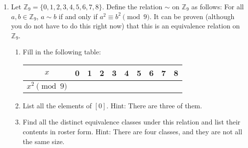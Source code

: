 \documentclass[11pt]{article}
\begin{document}
\begin{enumerate}
	\item Let $\mathbb{Z}_9 = \{ 0, 1, 2, 3, 4, 5, 6, 7, 8\}$. Define the relation $\sim$ on $\mathbb{Z}_9$ as follows: For all $a,b \in \mathbb{Z}_9$, $a \sim b$ if and only if $a^2 \equiv b^2 \pmod 9$. It can be proven (although you do not have to do this right now) that this is an equivalence relation on $\mathbb{Z}_9$. 
	\begin{enumerate}
		\item Fill in the following table: 
		\begin{center}
			\begin{tabular}{c|c|c|c|c|c|c|c|c|c}
			$x$ & 0 & 1 & 2 & 3 & 4 & 5 & 6  & 7 & 8 \\ \hline
			$x^2 \pmod 9$ & & & & & & & &
			\end{tabular}
		\end{center}
		\item List all the elements of $[0]$. Hint: There are three of them. 
		\item Find all the distinct equivalence classes under this relation and list their contents in roster form. Hint: There are four classes, and they are not all the same size. 
	\end{enumerate}
	
	

\end{enumerate}
\end{document}
